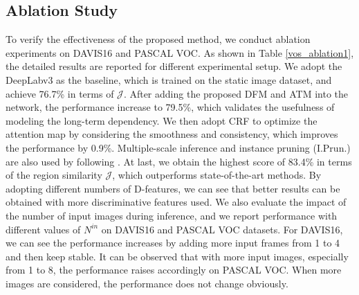 \documentclass[runningheads]{llncs}
\begin{document}
\begin{table*}[t!]
	\caption{Ablation study  on  DAVIS16 with different components used and  different numbers of D-features adopted. We also compare the performance  for different numbers of input images  on DAVIS16 and PASCAL VOC. }
\centering
	\label{vos_ablation1}
\end{table*}
\subsection{Ablation Study}\label{exp_ablation}
To verify the effectiveness of the proposed method, we conduct ablation experiments on DAVIS16 and PASCAL VOC. As shown in Table \ref{vos_ablation1}, the detailed results are reported for different experimental setup. We adopt the DeepLabv3 as the baseline, which is trained on the static image dataset, and achieve 76.7\% in terms of $\mathcal{J}$. After adding the proposed DFM and ATM into the network, the performance increase to 79.5\%, which validates the usefulness of modeling the long-term dependency. We then adopt  CRF to optimize the attention map by considering the smoothness and consistency, which improves the performance by 0.9\%. Multiple-scale inference and instance pruning (I.Prun.) are also used by following \cite{vos_andiff}. At last, we obtain the highest score of 83.4\% in terms of the region similarity $\mathcal{J}$, which outperforms state-of-the-art methods. By adopting different numbers of D-features, we can see that better results can be obtained with more discriminative features used. We also evaluate the impact of the number of input images during inference, and we report performance with different values of $N^{in}$ on  DAVIS16 and PASCAL VOC datasets. For DAVIS16, we can see the performance increases by adding more input frames from 1 to 4 and then keep stable. It can be observed that with more input images, especially from 1  to 8, the performance raises accordingly on PASCAL VOC. When more images are considered, the performance does not change obviously. 
\end{document}
